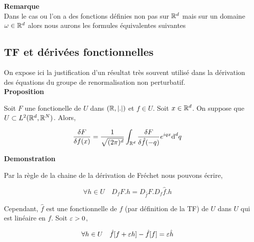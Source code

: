 \documentclass[10pt]{article}
\begin{document}
\begin{multicols}{2}
\vspace*{11pt}

\textbf{Remarque} \\
Dans le cas ou l'on a des fonctions définies non pas sur $\mathbb{R}^d$ mais sur un domaine $\omega \in \mathbb{R}^d$ alors nous aurons les formules équivalentes suivantes




\vspace*{11pt}

\subsection{TF et dérivées fonctionnelles}


On expose ici la justification d'un résultat très souvent utilisé dans la dérivation des équations du groupe de renormalisation non perturbatif.\\ 

\textbf{Proposition}

Soit $F$ une fonctionelle de $U$ dans $(\mathbb{R},|.|)$ et $f \in U$.
Soit $x \in \mathbb{R}^d$. On suppose que $U \subset L^2(\mathbb{R}^d, \mathbb{R}^N)$. 
Alors, 

\begin{equation}
  \frac{\delta F}{\delta f(x)} = \frac{1}{\sqrt{(2\pi)^d}} \int_{\mathbb{R}^d} \frac{\delta F}{\delta \hat{f}(-q)} e^{iqx} \text{d}^d q
\end{equation} 


\vspace*{11pt}
\textbf{Demonstration}

Par la règle de la chaine de la dérivation de Fréchet nous pouvons écrire, 

\begin{equation}
  \forall h \in U \quad D_fF.h = D_{\hat{f}}F. D_f \hat{f}.h
\end{equation}



Cependant, $\hat{f}$ est une fonctionnelle de $f$ (par définition de la TF) de $U$ dans $U$ qui est linéaire en $f$. Soit $\varepsilon >0$, 

\begin{equation}
  \forall h \in U \quad \hat{f}[f + \varepsilon h] - \hat{f}[f] = \varepsilon \hat{h} 
\end{equation} 


\end{multicols}
\end{document}
